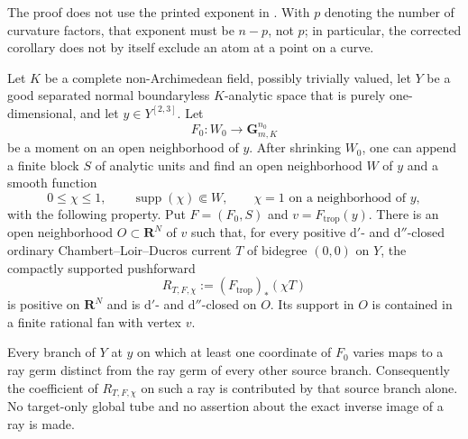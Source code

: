 \begin{remark}
\label{rem:p213-trivial-gauss-rigid-zero-atom-index}
The proof does not use the printed exponent in
\cite[Corollary~16.8.6]{CLD25}.  With $p$ denoting the number of curvature
factors, that exponent must be $n-p$, not $p$; in particular, the corrected
corollary does not by itself exclude an atom at a point on a curve.
\end{remark}


\begin{lemma}
\label{lem:p213-variation-graph-source-cutoff}
Let $K$ be a complete non-Archimedean field, possibly trivially valued,
let $Y$ be a good separated normal boundaryless $K$-analytic space that is
purely one-dimensional, and let $y\in Y^{[2,3]}$.  Let
\[
                  F_0:W_0\longrightarrow\mathbf G_{m,K}^{n_0}
\]
be a moment on an open neighborhood of $y$.  After shrinking $W_0$, one
can append a finite block $S$ of analytic units and find an open
neighborhood $W$ of $y$ and a smooth function
\[
       0\leq\chi\leq1,\qquad
       \operatorname{supp}(\chi)\Subset W,\qquad
       \chi=1\text{ on a neighborhood of }y,
\]
with the following property.  Put $F=(F_0,S)$ and
$v=F_{\mathrm{trop}}(y)$.  There is an open neighborhood
$O\subset\mathbf R^N$ of $v$ such that, for every positive
$\mathrm d'$- and $\mathrm d''$-closed ordinary Chambert--Loir--Ducros
current $T$ of bidegree $(0,0)$ on $Y$, the compactly supported
pushforward
\begin{equation}
             R_{T,F,\chi}:=(F_{\mathrm{trop}})_*(\chi T)
\label{eq:p213-source-cutoff-pushforward}
\end{equation}
is positive on $\mathbf R^N$ and is $\mathrm d'$- and
$\mathrm d''$-closed on $O$.  Its support in $O$ is contained in a finite
rational fan with vertex $v$.

Every branch of $Y$ at $y$ on which at least one coordinate of $F_0$
varies maps to a ray germ distinct from the ray germ of every other
source branch.  Consequently the coefficient of
$R_{T,F,\chi}$ on such a ray is contributed by that source branch alone.
No target-only global tube and no assertion about the exact inverse image
of a ray is made.
\end{lemma}

